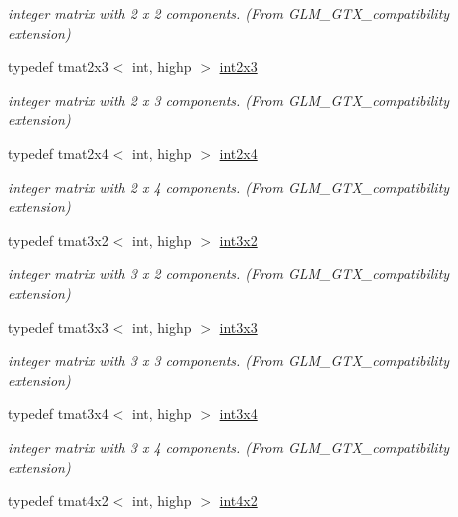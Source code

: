 \begin{DoxyCompactItemize}
\begin{DoxyCompactList}\small\item\em integer matrix with 2 x 2 components. (From G\+L\+M\+\_\+\+G\+T\+X\+\_\+compatibility extension) \end{DoxyCompactList}\item 
typedef tmat2x3$<$ int, highp $>$ \hyperlink{group__gtx__compatibility_ga37b2b18255fa5ff7fa23d8b1d34b8034}{int2x3}
\begin{DoxyCompactList}\small\item\em integer matrix with 2 x 3 components. (From G\+L\+M\+\_\+\+G\+T\+X\+\_\+compatibility extension) \end{DoxyCompactList}\item 
typedef tmat2x4$<$ int, highp $>$ \hyperlink{group__gtx__compatibility_gaa402ce479f756c0805d25fede99251e3}{int2x4}
\begin{DoxyCompactList}\small\item\em integer matrix with 2 x 4 components. (From G\+L\+M\+\_\+\+G\+T\+X\+\_\+compatibility extension) \end{DoxyCompactList}\item 
typedef tmat3x2$<$ int, highp $>$ \hyperlink{group__gtx__compatibility_gac99c78a227d95384611146a64c4d3ce8}{int3x2}
\begin{DoxyCompactList}\small\item\em integer matrix with 3 x 2 components. (From G\+L\+M\+\_\+\+G\+T\+X\+\_\+compatibility extension) \end{DoxyCompactList}\item 
typedef tmat3x3$<$ int, highp $>$ \hyperlink{group__gtx__compatibility_ga4eb54b9ea96f12c04faaf2ca7b7c8c70}{int3x3}
\begin{DoxyCompactList}\small\item\em integer matrix with 3 x 3 components. (From G\+L\+M\+\_\+\+G\+T\+X\+\_\+compatibility extension) \end{DoxyCompactList}\item 
typedef tmat3x4$<$ int, highp $>$ \hyperlink{group__gtx__compatibility_ga7500192cce87fb3a48f7119d6646af5a}{int3x4}
\begin{DoxyCompactList}\small\item\em integer matrix with 3 x 4 components. (From G\+L\+M\+\_\+\+G\+T\+X\+\_\+compatibility extension) \end{DoxyCompactList}\item 
typedef tmat4x2$<$ int, highp $>$ \hyperlink{group__gtx__compatibility_ga91c24f1a2df5d20ea98f97ec243782c3}{int4x2}

\end{DoxyCompactItemize}
